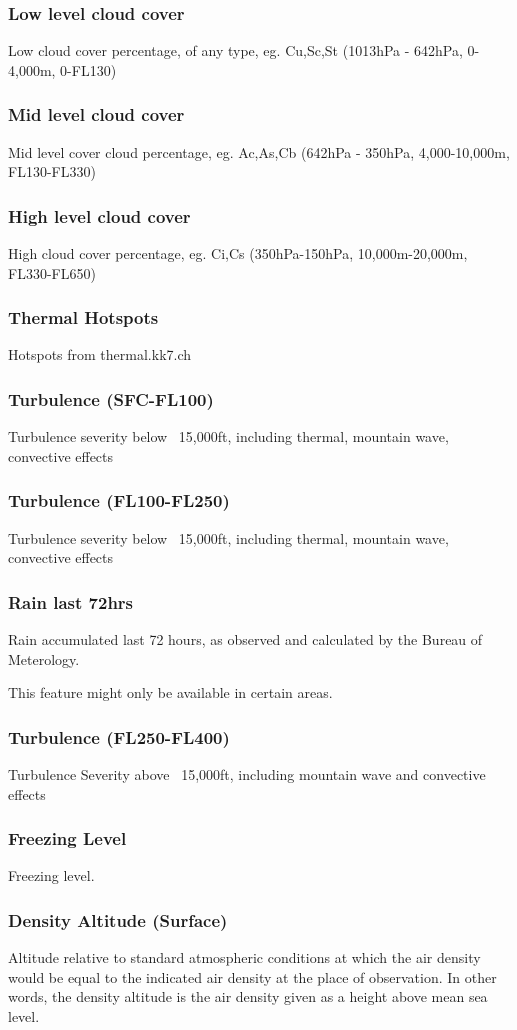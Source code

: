 \documentclass[11pt,a4paper]{article}
\begin{document}
\subsubsection{Low level cloud cover}
Low cloud cover percentage, of any type, eg. Cu,Sc,St (1013hPa - 642hPa, 0-4,000m, 0-FL130)
\subsubsection{Mid level cloud cover}
Mid level cover cloud percentage, eg. Ac,As,Cb (642hPa - 350hPa, 4,000-10,000m, FL130-FL330)
\subsubsection{High level cloud cover}
High cloud cover percentage, eg. Ci,Cs (350hPa-150hPa, 10,000m-20,000m, FL330-FL650)
\subsubsection{Thermal Hotspots}
Hotspots from thermal.kk7.ch
\subsubsection{Turbulence (SFC-FL100)}
Turbulence severity below ~15,000ft, including thermal, mountain wave, convective effects
\subsubsection{Turbulence (FL100-FL250)}
Turbulence severity below ~15,000ft, including thermal, mountain wave, convective effects
\subsubsection{Rain last 72hrs}
Rain accumulated last 72 hours, as observed and calculated by the Bureau of Meterology.
\begin{tip}
\item This feature might only be available in certain areas.\\
\end{tip}
\subsubsection{Turbulence (FL250-FL400)}
Turbulence Severity above ~15,000ft, including mountain wave and convective effects
\subsubsection{Freezing Level}
Freezing level.
\subsubsection{Density Altitude (Surface)}
Altitude relative to standard atmospheric conditions at which the air density would be equal to the indicated air density at the place of observation. In other words, the density altitude is the air density given as a height above mean sea level.
\end{document}
